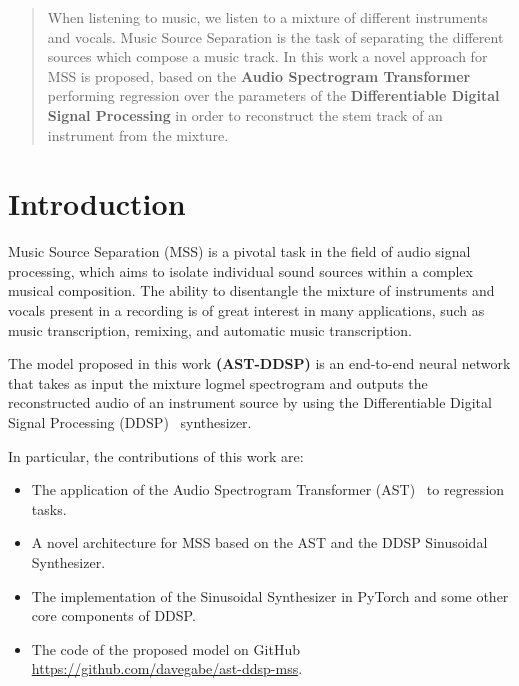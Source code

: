\documentclass{article}
\begin{document}

\printAffiliationsAndNotice{}

\begin{abstract}
    When listening to music, we listen to a mixture of different instruments and vocals.
    Music Source Separation is the task of separating the different sources which compose a music track.
    In this work a novel approach for MSS is proposed, based on the \textbf{Audio Spectrogram Transformer} performing
    regression over the parameters of the \textbf{Differentiable Digital Signal Processing}
    in order to reconstruct the stem track of an instrument from the mixture.
\end{abstract}


\section{Introduction}
Music Source Separation (MSS) is a pivotal task in the field of audio signal processing, which aims to isolate individual sound sources within a complex musical composition.
The ability to disentangle the mixture of instruments and vocals present in a recording is of great interest
in many applications, such as music transcription, remixing, and automatic music transcription.

The model proposed in this work \textbf{(AST-DDSP)} is an end-to-end neural network that takes as input the mixture logmel spectrogram and outputs
the reconstructed audio of an instrument source by using the Differentiable Digital Signal Processing (DDSP)~\cite{ddsp} synthesizer.

In particular, the contributions of this work are:
\begin{itemize}
    \item The application of the Audio Spectrogram Transformer (AST)~\cite{gong21b_interspeech} to regression tasks.
    \item A novel architecture for MSS based on the AST and the DDSP Sinusoidal Synthesizer.
    \item The implementation of the Sinusoidal Synthesizer in PyTorch and some other core components of DDSP.
    \item The code of the proposed model on GitHub \url{https://github.com/davegabe/ast-ddsp-mss}.
\end{itemize}
\smallskip
\end{document}
